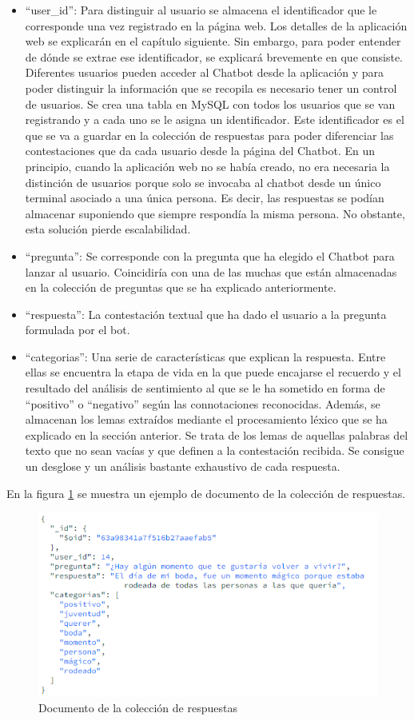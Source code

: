 \begin{itemize}
	\item ``user\_id'': Para distinguir al usuario se almacena el identificador que le corresponde una vez registrado en la página web. Los detalles de la aplicación web se explicarán en el capítulo siguiente. Sin embargo, para poder entender de dónde se extrae ese identificador, se explicará brevemente en que consiste. Diferentes usuarios pueden acceder al Chatbot desde la aplicación y para poder distinguir la información que se recopila es necesario tener un control de usuarios. Se crea una tabla en MySQL con todos los usuarios que se van registrando y a cada uno se le asigna un identificador. Este identificador es el que se va a guardar en la colección de respuestas para poder diferenciar las contestaciones que da cada usuario desde la página del Chatbot. En un principio, cuando la aplicación web no se había creado, no era necesaria la distinción de usuarios porque solo se invocaba al chatbot desde un único terminal asociado a una única persona. Es decir, las respuestas se podían almacenar suponiendo que siempre respondía la misma persona. No obstante, esta solución pierde escalabilidad. 
	\item ``pregunta'': Se corresponde con la pregunta que ha elegido el Chatbot para lanzar al usuario. Coincidiría con una de las muchas que están almacenadas en la colección de preguntas que se ha explicado anteriormente. 
	\item ``respuesta'': La contestación textual que ha dado el usuario a la pregunta formulada por el bot. 
	\item ``categorias'': Una serie de características que explican la respuesta. Entre ellas se encuentra la etapa de vida en la que puede encajarse el recuerdo y el resultado del análisis de sentimiento al que se le ha sometido en forma de ``positivo'' o ``negativo'' según las connotaciones reconocidas. Además, se almacenan los lemas extraídos mediante el procesamiento léxico que se ha explicado en la sección anterior. Se trata de los lemas de aquellas palabras del texto que no sean vacías y que definen a la contestación recibida. Se consigue un desglose y un análisis bastante exhaustivo de cada respuesta. 
\end{itemize}

En la figura \ref{fig:mongo_resp} se muestra un ejemplo de documento de la colección de respuestas.

\begin{figure}[h]
	\centering
	\includegraphics[scale=0.8]{Imagenes/Vectorial/mongo_respuesta}
	\caption{Documento de la colección de respuestas}
	\label{fig:mongo_resp}
\end{figure}


